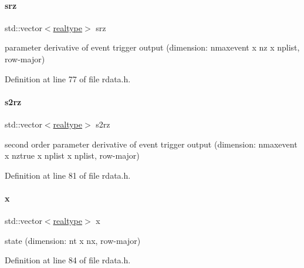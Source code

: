 \mbox{\label{classamici_1_1_return_data_ada7991b82464e52bcdc20c69175fe1e9}} 
\paragraph{\texorpdfstring{srz}{srz}}
{\footnotesize\ttfamily std\+::vector$<$\mbox{\hyperlink{namespaceamici_a1bdce28051d6a53868f7ccbf5f2c14a3}{realtype}}$>$ srz}

parameter derivative of event trigger output (dimension\+: nmaxevent x nz x nplist, row-\/major) 

Definition at line 77 of file rdata.\+h.

\mbox{\label{classamici_1_1_return_data_ade4be6e8e3e8cc9eb4642904e3e9ce56}} 
\paragraph{\texorpdfstring{s2rz}{s2rz}}
{\footnotesize\ttfamily std\+::vector$<$\mbox{\hyperlink{namespaceamici_a1bdce28051d6a53868f7ccbf5f2c14a3}{realtype}}$>$ s2rz}

second order parameter derivative of event trigger output (dimension\+: nmaxevent x nztrue x nplist x nplist, row-\/major) 

Definition at line 81 of file rdata.\+h.

\mbox{\label{classamici_1_1_return_data_a7ca297ad69affe8b20e8f81b9eb38cd1}} 
\paragraph{\texorpdfstring{x}{x}}
{\footnotesize\ttfamily std\+::vector$<$\mbox{\hyperlink{namespaceamici_a1bdce28051d6a53868f7ccbf5f2c14a3}{realtype}}$>$ x}

state (dimension\+: nt x nx, row-\/major) 

Definition at line 84 of file rdata.\+h.

\mbox{\label{classamici_1_1_return_data_ac3288cc7f649605938f1fd1b459d3d8c}} 
